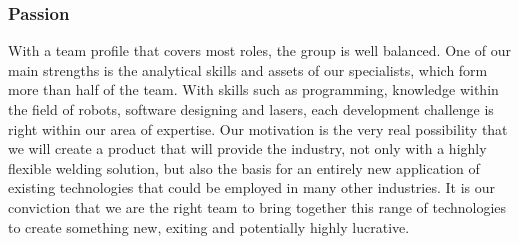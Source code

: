


\subsubsection{Passion}
With a team profile that covers most roles, the group is well balanced. One of our main strengths is the analytical skills and assets of our specialists, which form more than half of the team.  
With skills such as programming, knowledge within the field of robots, software designing and lasers, each development challenge is right within our area of expertise. 
Our motivation is the very real possibility that we will create a product that will provide the industry, not only with a highly flexible welding solution, but also the basis for an entirely new application of existing technologies that could be employed in many other industries.
It is our conviction that we are the right team to bring together this range of technologies to create something new, exiting and potentially highly lucrative.